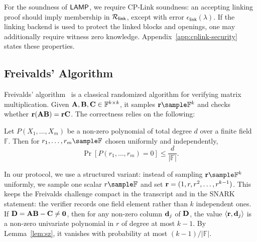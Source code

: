 \begin{remark}
For the soundness of \(\textsf{LAMP}\), we require CP-Link soundness: an accepting
linking proof should imply membership in \({\mathcal{R}}_{\mathsf{link}}\), except
with error \(\epsilon_{\mathsf{link}}(\lambda)\).  If the linking backend is used
to protect the linked blocks and openings, one may additionally require witness
zero knowledge.  Appendix~\ref{app:cplink-security} states these properties.
\end{remark}

\subsection{Freivalds' Algorithm}
\label{sec:prelim-freivalds}

Freivalds' algorithm~\cite{freivalds1977probabilistic} is a classical randomized algorithm for verifying matrix multiplication.
Given $\mathbf{A}, \mathbf{B}, \mathbf{C} \in \mathbb{F}^{k \times k}$, it samples $\vect{r} \sample \mathbb{F}^k$ and checks whether $\mathbf{r}(\mathbf{A}\mathbf{B}) = \mathbf{r}\mathbf{C}$.
The correctness relies on the following:

\begin{lemma}\label{lem:sz}
Let $P(X_1, \ldots, X_m)$ be a non-zero polynomial of total degree $d$ over a finite field $\mathbb{F}$.
Then for $r_1, \ldots, r_m \sample \mathbb{F}$ chosen uniformly and independently,
\[
\Pr[P(r_1, \ldots, r_m) = 0] \le \frac{d}{|\mathbb{F}|}.
\]
\end{lemma}

In our protocol, we use a structured variant: instead of sampling $\vect{r} \sample \mathbb{F}^k$ uniformly, we sample one scalar $r \sample \mathbb{F}$ and set $\mathbf{r} = (1, r, r^2, \ldots, r^{k-1})$.
This keeps the Freivalds challenge compact in the transcript and in the SNARK
statement: the verifier records one field element rather than $k$ independent
ones. If $\mathbf{D} = \mathbf{A}\mathbf{B} - \mathbf{C} \neq \mathbf{0}$, then for any non-zero
column $\mathbf{d}_j$ of $\mathbf{D}$, the value $\langle \mathbf{r}, \mathbf{d}_j \rangle$ is a non-zero univariate polynomial in
$r$ of degree at most $k-1$.
By Lemma~\ref{lem:sz}, it vanishes with probability at most $(k-1)/|\mathbb{F}|$.
